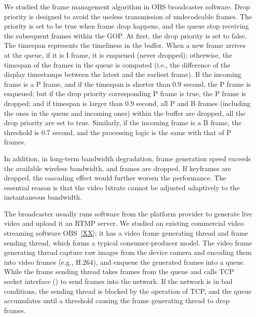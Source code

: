 We studied the frame management algorithm in OBS broadcaster software. Drop priority is designed to avoid the useless transmission of undecodeable frames. The priority is set to be true when frame drop happens, and the queue stop receiving the subsequent frames within the GOP. At first, the drop priority is set to false. The timespan represents the timeliness in the buffer. When a new frame arrives at the queue, if it is I frame, it is enqueued (never dropped); otherwise, the timespan of the frames in the queue is computed (i.e., the difference of the display timestamps between the latest and the earliest frame). If the incoming frame is a P frame, and if the timespan is shorter than 0.9 second, the P frame is enqueued; but if the drop priority corresponding P frame is true, the P frame is dropped; and if timespan is larger than 0.9 second, all P and B frames (including the ones in the queue and incoming ones) within the buffer are dropped, all the drop priority are set to true. Similarly, if the incoming frame is a B frame, the threshold is 0.7 second, and the processing logic is the same with that of P frames.

In addition, in long-term bandwidth degradation, frame generation speed exceeds the available wireless bandwidth, and frames are dropped. If keyframes are dropped, the cascading effect would further worsen the performance. The essential reason is that the video bitrate cannot be adjusted adaptively to the instantaneous bandwidth.

\iffalse

The broadcaster usually runs software from the platform provider to generate live video and upload it an RTMP server. We studied an existing commercial video streaming software OBS~\ref{XX}; it has a video frame generating thread and frame sending thread, which forms a typical consumer-producer model. The video frame generating thread capture raw images from the device camera and encoding them into video frames (e.g., H.264), and enqueue the generated frames into a queue. While the frame sending thread takes frames from the queue and calls TCP socket interface (\mywrite) to send frames into the network. If the network is in bad conditions, the sending thread is blocked by the \mywrite operation of TCP, and the queue accumulates until a threshold causing the frame generating thread to drop frames.


